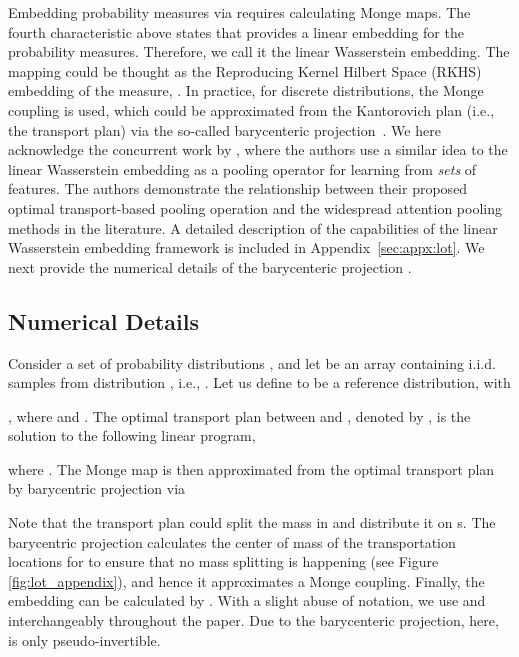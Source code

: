 \documentclass[table]{article} \usepackage{iclr2021_conference,times}
\begin{document}
Embedding probability measures  via  requires calculating  Monge maps. The fourth characteristic above states that    provides a linear embedding for the probability measures. Therefore, we call it the linear Wasserstein embedding. The mapping  could be thought as the Reproducing Kernel Hilbert Space (RKHS) embedding of the measure,  \citep{muandet2017kernel}. In practice, for discrete distributions, the Monge coupling is used, which could be approximated from the Kantorovich plan (i.e., the transport plan) via the so-called barycenteric projection~\citep{wang2013linear}. We here acknowledge the concurrent work by \citet{mialon2021a}, where the authors use a similar idea to the linear Wasserstein embedding as a pooling operator for learning from \emph{sets} of features. The authors demonstrate the relationship between their proposed optimal transport-based pooling operation and the widespread attention pooling methods in the literature.  A detailed description of the capabilities of the linear Wasserstein embedding framework is included in Appendix~\ref{sec:appx:lot}. We next provide the numerical details of the barycenteric projection \citep{ambrosio2008gradient,wang2013linear}.

\vspace{-0.05in}
\subsection{Numerical Details}
\vspace{-0.05in}

Consider a set of probability distributions , and let 
be an array containing  i.i.d. samples from distribution , i.e., . 
Let us define  to be a reference distribution, with 

, where  and . The optimal transport plan between  and , denoted by , is the solution to the following linear program,
\vspace{-.05in}

where .
The Monge map is then approximated from the optimal transport plan by barycentric projection via

Note that the transport plan  could split the mass in  and distribute it on s. The barycentric projection calculates the center of mass of the transportation locations for  to ensure that no mass splitting is happening  (see Figure \ref{fig:lot_appendix}), and hence it approximates a Monge coupling. Finally, the embedding can be calculated by . With a slight abuse of notation, we use  and  interchangeably throughout the paper. Due to the barycenteric projection, here,  is only pseudo-invertible. 
\end{document}

